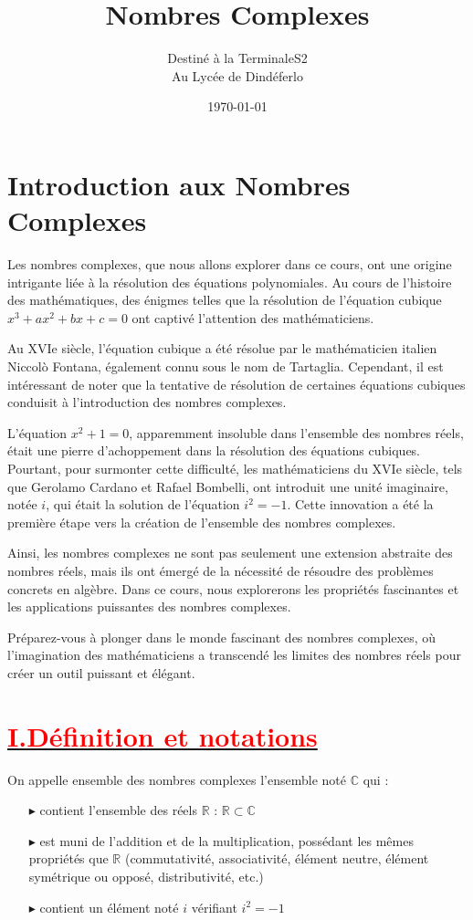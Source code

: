 \documentclass[12pt]{article}
\author{Destiné à la TerminaleS2\\Au Lycée de Dindéferlo}
\title{\textbf{Nombres Complexes}}
\date{\today}
\begin{document}
\maketitle
\newpage
\section*{Introduction aux Nombres Complexes}

Les nombres complexes, que nous allons explorer dans ce cours, ont une origine intrigante liée à la résolution des équations polynomiales. Au cours de l'histoire des mathématiques, des énigmes telles que la résolution de l'équation cubique $x^3 + ax^2 + bx + c = 0$ ont captivé l'attention des mathématiciens.

Au XVIe siècle, l'équation cubique a été résolue par le mathématicien italien Niccolò Fontana, également connu sous le nom de Tartaglia. Cependant, il est intéressant de noter que la tentative de résolution de certaines équations cubiques conduisit à l'introduction des nombres complexes.

L'équation $x^2 + 1 = 0$, apparemment insoluble dans l'ensemble des nombres réels, était une pierre d'achoppement dans la résolution des équations cubiques. Pourtant, pour surmonter cette difficulté, les mathématiciens du XVIe siècle, tels que Gerolamo Cardano et Rafael Bombelli, ont introduit une unité imaginaire, notée $i$, qui était la solution de l'équation $i^2 = -1$. Cette innovation a été la première étape vers la création de l'ensemble des nombres complexes.

Ainsi, les nombres complexes ne sont pas seulement une extension abstraite des nombres réels, mais ils ont émergé de la nécessité de résoudre des problèmes concrets en algèbre. Dans ce cours, nous explorerons les propriétés fascinantes et les applications puissantes des nombres complexes.

Préparez-vous à plonger dans le monde fascinant des nombres complexes, où l'imagination des mathématiciens a transcendé les limites des nombres réels pour créer un outil puissant et élégant.

\section*{\underline{\textbf{\textcolor{red}{I.Définition et notations }}}}

On appelle ensemble des nombres complexes l'ensemble noté $\mathbb{C}$ qui :

\begin{itemize}
  \item[$\blacktriangleright$] contient l'ensemble des réels $\mathbb{R}$ : $\mathbb{R} \subset \mathbb{C}$
  \item[$\blacktriangleright$] est muni de l'addition et de la multiplication, possédant les mêmes propriétés que $\mathbb{R}$ (commutativité, associativité, élément neutre, élément symétrique ou opposé, distributivité, etc.)
  \item[$\blacktriangleright$] contient un élément noté $i$ vérifiant $i^{2}=-1$
\end{itemize}
\end{document}
